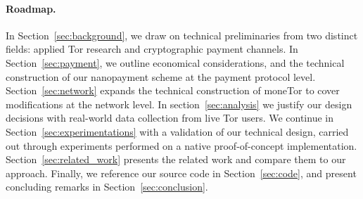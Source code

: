 \paragraph*{Roadmap.} In Section~\ref{sec:background}, we draw on technical
preliminaries from two distinct fields: applied Tor research and cryptographic
payment channels.
In Section~\ref{sec:payment}, we outline economical considerations, and the technical construction of
our nanopayment scheme at the payment protocol level. Section~\ref{sec:network}
expands the technical construction of moneTor to cover modifications at the
network level. In section~\ref{sec:analysis} we justify our design decisions
with real-world data collection from live Tor users. We continue in
Section~\ref{sec:experimentations} with a validation of our technical design,
carried out through experiments performed on a native proof-of-concept
implementation.
 Section~\ref{sec:related_work} presents the related work and compare them to our approach.
Finally, we reference our source code in
Section~\ref{sec:code}, and present concluding remarks in
Section~\ref{sec:conclusion}.

